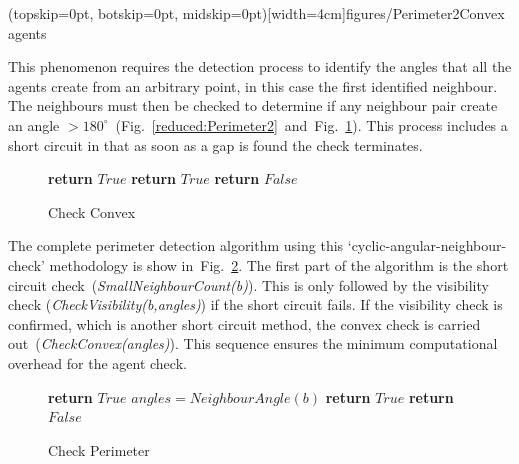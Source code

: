 \documentclass{ieeeaccess}
\begin{document}
\Figure[t!](topskip=0pt, botskip=0pt, midskip=0pt)[width=4cm]{figures/Perimeter2}{Convex agents\label{reduced:Perimeter2}}

This phenomenon requires the detection process to identify the angles that all the agents create from an arbitrary point, in this case the first identified neighbour. The neighbours must then be checked to determine if any neighbour pair create an angle $> 180^\circ$~(Fig.~\ref{reduced:Perimeter2}~and~Fig.~\ref{algo:CheckConvex}). This process includes a short circuit in that as soon as a gap is found the check terminates. 

\begin{figure}
\begin{algorithmic}[1]
{}
\State\textbf{return} $True$
\EndIf
\EndIf
{}
\State\textbf{return} $True$
\EndIf
\EndFor
\State\textbf{return} $False$
\EndProcedure
\end{algorithmic}
\caption{Check Convex}
\label{algo:CheckConvex}
\end{figure}

The complete perimeter detection algorithm using this `cyclic-angular-neighbour-check' methodology is show in~Fig.~\ref{algo:CheckPerimeter}. The first part of the algorithm is the short circuit check~(\textit{SmallNeighbourCount(b)}). This is only followed by the visibility check (\textit{CheckVisibility(b,angles)}) if the short circuit fails. If the visibility check is confirmed, which is another short circuit method, the convex check is carried out~(\textit{CheckConvex(angles)}). This sequence ensures the minimum computational overhead for the agent check. 

\begin{figure}
\begin{algorithmic}[1]
{}
\State\textbf{return} $True$
\EndIf
\State$angles = NeighbourAngle(b)$
\State\textbf{return} $True$
\EndIf
\EndIf
\State\textbf{return} $False$
\EndProcedure
\end{algorithmic}
\caption{Check Perimeter}
\label{algo:CheckPerimeter}
\end{figure}
\end{document}
